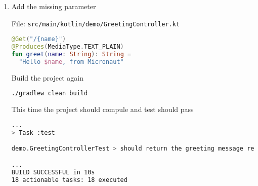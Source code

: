 \begin{enumerate}
Build the project

\begin{lstlisting}[language=bash]
./gradlew clean build
\end{lstlisting}

The compiler will fail

\begin{lstlisting}[language=bash]
...
> Task :kaptKotlin FAILED
/Users/albertattard/work/projects/albertattard/demo/build/tmp/kapt3/stubs/main/demo/GreetingController.java:12: error: The route declares a uri variable named [name], but no corresponding method argument is present
    public final java.lang.String greet() {
                                  ^Note: Creating bean classes for 2 ...

FAILURE: Build failed with an exception.
...
\end{lstlisting}

Micronaut resolves everything at compile time.

\item Add the missing parameter

File: \texttt{src/main/kotlin/demo/GreetingController.kt}
\begin{lstlisting}[language=Kotlin]
@Get("/{name}")
@Produces(MediaType.TEXT_PLAIN)
fun greet(name: String): String =
  "Hello $name, from Micronaut"
\end{lstlisting}

Build the project again

\begin{lstlisting}[language=bash]
./gradlew clean build
\end{lstlisting}

This time the project should compule and test should pass

\begin{lstlisting}[language=bash]
...
> Task :test

demo.GreetingControllerTest > should return the greeting message returned by the greeting service PASSED

...
BUILD SUCCESSFUL in 10s
18 actionable tasks: 18 executed
\end{lstlisting}

\end{enumerate}
